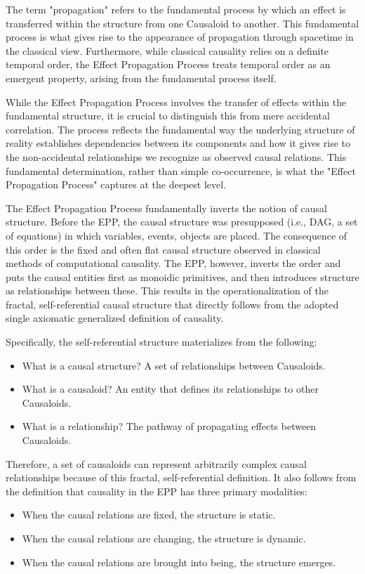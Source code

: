 The term "propagation" refers to the fundamental process by which an effect is transferred within the structure from one Causaloid to another. This fundamental process is what gives rise to the appearance of propagation through spacetime in the classical view. Furthermore, while classical causality relies on a definite temporal order, the Effect Propagation Process treats temporal order as an emergent property, arising from the fundamental process itself.

While the Effect Propagation Process involves the transfer of effects within the fundamental structure, it is crucial to distinguish this from mere accidental correlation. The process reflects the fundamental way the underlying structure of reality establishes dependencies between its components and how it gives rise to the non-accidental relationships we recognize as observed causal relations. This fundamental determination, rather than simple co-occurrence, is what the "Effect Propagation Process" captures at the deepest level.

 The Effect Propagation Process fundamentally inverts the notion of causal structure. Before the EPP, the causal structure was presupposed (i.e., DAG, a set of equations) in which variables, events, objects are placed. The consequence of this order is the fixed and often flat causal structure observed in classical methods of computational causality. The EPP, however, inverts the order and puts the causal entities first as monoidic primitives, and then introduces structure as relationships between these. This results in the operationalization of the fractal, self-referential causal structure that directly follows from the adopted single axiomatic generalized definition of causality. 
 
Specifically, the self-referential structure materializes from the following:

\begin{itemize}
	\item What is a causal structure? A set of relationships between Causaloids.
 	\item What is a causaloid? An entity that defines its relationships to other Causaloids. 
	\item What is a relationship? The pathway of propagating effects between Causaloids.
\end{itemize}

Therefore, a set of causaloids can represent arbitrarily complex causal relationships because of this fractal, self-referential definition. It also follows from the definition that causality in the EPP has three primary modalities:
\begin{itemize}
	\item When the causal relations are fixed, the structure is static.
 	\item When the causal relations are changing, the structure is dynamic. 
 	\item When the causal relations are brought into being, the structure emerges. 
\end{itemize}

